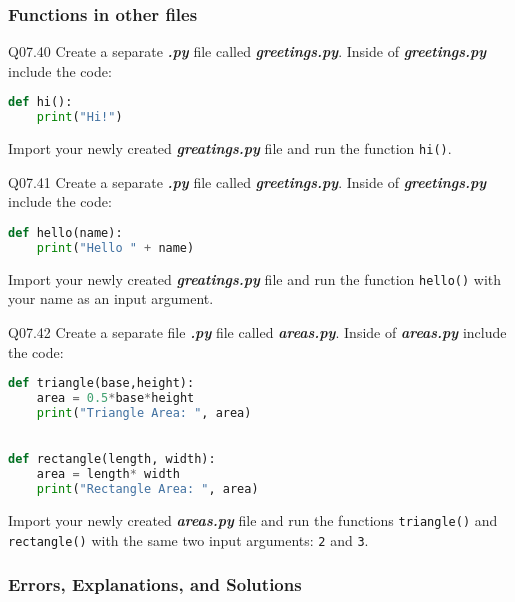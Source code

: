 \documentclass{book}
\newenvironment{problems}{}{}  %
\newcommand{\passthrough}[1]{#1}
\begin{document}
    
        \begin{problems}
        \hypertarget{functions-in-other-files}{%
\subsubsection{Functions in other
files}\label{functions-in-other-files}}

Q07.40 Create a separate \textbf{\emph{.py}} file called
\textbf{\emph{greetings.py}}. Inside of \textbf{\emph{greetings.py}}
include the code:

\begin{lstlisting}[language=Python]
def hi():
    print("Hi!")
\end{lstlisting}

Import your newly created \textbf{\emph{greatings.py}} file and run the
function \passthrough{\lstinline!hi()!}.

Q07.41 Create a separate \textbf{\emph{.py}} file called
\textbf{\emph{greetings.py}}. Inside of \textbf{\emph{greetings.py}}
include the code:

\begin{lstlisting}[language=Python]
def hello(name):
    print("Hello " + name)
\end{lstlisting}

Import your newly created \textbf{\emph{greatings.py}} file and run the
function \passthrough{\lstinline!hello()!} with your name as an input
argument.

Q07.42 Create a separate file \textbf{\emph{.py}} file called
\textbf{\emph{areas.py}}. Inside of \textbf{\emph{areas.py}} include the
code:

\begin{lstlisting}[language=Python]
def triangle(base,height):
    area = 0.5*base*height
    print("Triangle Area: ", area)
    

def rectangle(length, width):
    area = length* width
    print("Rectangle Area: ", area)
\end{lstlisting}

Import your newly created \textbf{\emph{areas.py}} file and run the
functions \passthrough{\lstinline!triangle()!} and
\passthrough{\lstinline!rectangle()!} with the same two input arguments:
\passthrough{\lstinline!2!} and \passthrough{\lstinline!3!}.
        \end{problems}

    




    
        \hypertarget{errors-explanations-and-solutions}{%
\subsubsection{Errors, Explanations, and
Solutions}\label{errors-explanations-and-solutions}}
\end{document}
